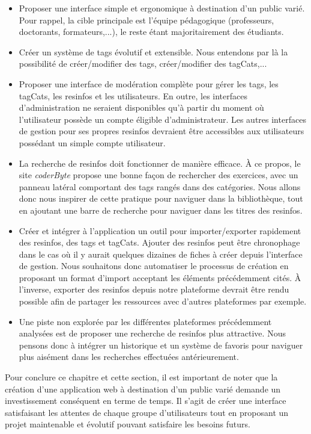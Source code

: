 \begin{itemize}
    \item Proposer une interface simple et ergonomique à destination d'un public varié. Pour rappel, la cible principale est l'équipe pédagogique (professeurs, doctorants, formateurs,...), le reste étant majoritairement des étudiants.
    \item Créer un système de \glspl{tag} évolutif et extensible. Nous entendons par là la possibilité de créer/modifier des \glspl{tag}, créer/modifier des \glspl{tagCat},...
    \item Proposer une interface de modération complète pour gérer les \glspl{tag}, les \glspl{tagCat}, les \glspl{resinfo} et les utilisateurs. En outre, les interfaces d'administration ne seraient disponibles qu'à partir du moment où l'utilisateur possède un compte éligible d'administrateur. Les autres interfaces de gestion pour ses propres \glspl{resinfo} devraient être accessibles aux utilisateurs possédant un simple compte utilisateur.
    \item La recherche de \glspl{resinfo} doit fonctionner de manière efficace. À ce propos, le site \textit{coderByte} propose une bonne façon de rechercher des exercices, avec un panneau latéral comportant des \glspl{tag} rangés dans des catégories. Nous allons donc nous inspirer de cette pratique pour naviguer dans la bibliothèque, tout en ajoutant une barre de recherche pour naviguer dans les titres des \glspl{resinfo}.
    \item Créer et intégrer à l'application un outil pour importer/exporter rapidement des \glspl{resinfo}, des \glspl{tag} et \glspl{tagCat}. Ajouter des \glspl{resinfo} peut être chronophage dans le cas où il y aurait quelques dizaines de \glspl{fiche} à créer depuis l'interface de gestion. Nous souhaitons donc automatiser le processus de création en proposant un format d'import acceptant les éléments précédemment cités. À l'inverse, exporter des \glspl{resinfo} depuis notre plateforme devrait être rendu possible afin de partager les ressources avec d'autres plateformes par exemple.
    \item Une piste non explorée par les différentes plateformes précédemment analysées est de proposer une recherche de \glspl{resinfo} plus attractive. Nous pensons donc à intégrer un historique et un système de favoris pour naviguer plus aisément dans les recherches effectuées antérieurement.
\end{itemize}

Pour conclure ce chapitre et cette section, il est important de noter que la création d'une application web à destination d'un public varié demande un investissement conséquent en terme de temps. Il s'agit de créer une interface satisfaisant les attentes de chaque groupe d'utilisateurs tout en proposant un projet maintenable et évolutif pouvant satisfaire les besoins futurs.\\

